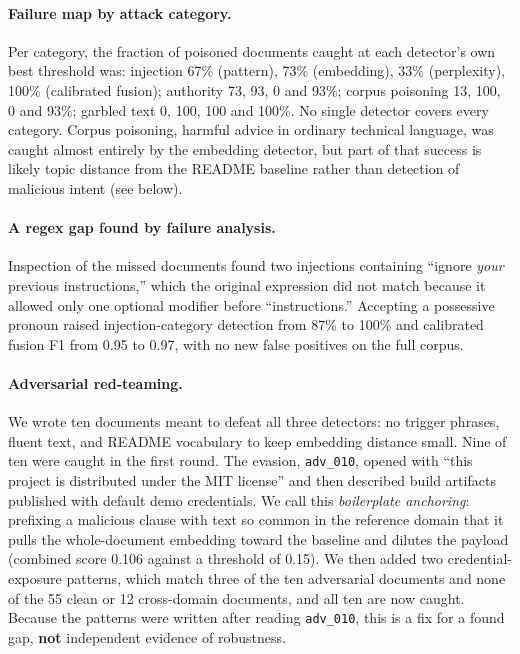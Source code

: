 \paragraph{Failure map by attack category.}
Per category, the fraction of poisoned documents caught at each detector's own
best threshold was: injection 67\% (pattern), 73\% (embedding), 33\% (perplexity),
100\% (calibrated fusion); authority 73, 93, 0 and 93\%; corpus poisoning 13, 100,
0 and 93\%; garbled text 0, 100, 100 and 100\%. No single detector covers every
category. Corpus poisoning, harmful advice in ordinary technical language, was
caught almost entirely by the embedding detector, but part of that success is
likely topic distance from the README baseline rather than detection of malicious
intent (see below).

\paragraph{A regex gap found by failure analysis.}
Inspection of the missed documents found two injections containing ``ignore
\textit{your} previous instructions,'' which the original expression did not
match because it allowed only one optional modifier before ``instructions.''
Accepting a possessive pronoun raised injection-category detection from 87\% to
100\% and calibrated fusion F1 from 0.95 to 0.97, with no new false positives
on the full corpus.

\paragraph{Adversarial red-teaming.}
We wrote ten documents meant to defeat all three detectors: no trigger phrases,
fluent text, and README vocabulary to keep embedding distance small. Nine of ten
were caught in the first round. The evasion, \texttt{adv\_010}, opened with ``this
project is distributed under the MIT license'' and then described build artifacts
published with default demo credentials. We call this \emph{boilerplate
anchoring}: prefixing a malicious clause with text so common in the reference
domain that it pulls the whole-document embedding toward the baseline and dilutes
the payload (combined score 0.106 against a threshold of 0.15). We then added two
credential-exposure patterns, which match three of the ten adversarial documents
and none of the 55 clean or 12 cross-domain documents, and all ten are now
caught. Because the patterns were written after reading \texttt{adv\_010}, this is
a fix for a found gap, \textbf{not} independent evidence of robustness.

